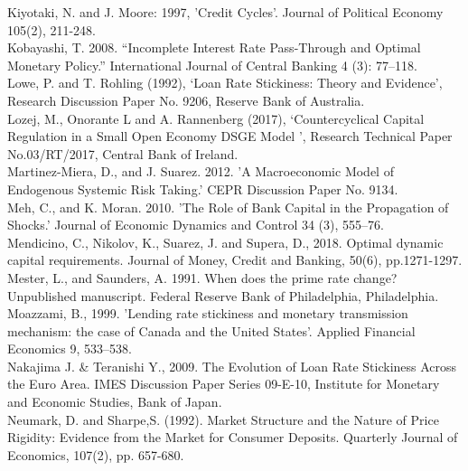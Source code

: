 \documentclass[12pt]{article}
\numberwithin{equation}{section}
\begin{document}
Kiyotaki, N. and J. Moore: 1997, 'Credit Cycles'. Journal of Political Economy
105(2), 211-248.\\

Kobayashi, T. 2008. “Incomplete Interest Rate Pass-Through and
Optimal Monetary Policy.” International Journal of Central
Banking 4 (3): 77–118.\\


Lowe, P. and T. Rohling (1992), ‘Loan Rate Stickiness: Theory and Evidence’, Research Discussion Paper No. 9206, Reserve Bank of Australia.\\

Lozej, M., Onorante L and A. Rannenberg (2017), ‘Countercyclical Capital Regulation
in a Small Open Economy DSGE Model
’, Research Technical Paper No.03/RT/2017, Central Bank of Ireland.\\

Martinez-Miera, D., and J. Suarez. 2012. 'A Macroeconomic Model
of Endogenous Systemic Risk Taking.' CEPR Discussion Paper
No. 9134.\\

Meh, C., and K. Moran. 2010. 'The Role of Bank Capital in the
Propagation of Shocks.' Journal of Economic Dynamics and
Control 34 (3), 555–76.\\

Mendicino, C., Nikolov, K., Suarez, J. and Supera, D., 2018. Optimal dynamic capital requirements. Journal of Money, Credit and Banking, 50(6), pp.1271-1297.\\


Mester, L., and Saunders, A. 1991. When does the prime rate change? Unpublished manuscript. Federal Reserve Bank of Philadelphia, Philadelphia.\\


Moazzami, B., 1999. 'Lending rate stickiness and monetary transmission mechanism: the case of Canada and the United States'.
Applied Financial Economics 9, 533–538.\\


Nakajima J. \& Teranishi Y., 2009. The Evolution of Loan Rate Stickiness Across the Euro Area. IMES Discussion Paper Series 09-E-10, Institute for Monetary and Economic Studies, Bank of Japan.\\


Neumark, D. and  Sharpe,S. (1992). Market Structure and the Nature of Price
Rigidity: Evidence from the Market for Consumer Deposits. Quarterly Journal of
Economics, 107(2), pp. 657-680.\\
\end{document}
